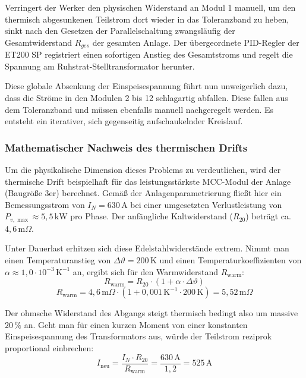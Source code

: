 Verringert der Werker den physischen Widerstand an Modul 1 manuell, um den thermisch abgesunkenen Teilstrom dort wieder in das Toleranzband zu heben, sinkt nach den Gesetzen der Parallelschaltung zwangsläufig der Gesamtwiderstand $R_{ges}$ der gesamten Anlage. Der übergeordnete PID-Regler der ET200 SP registriert einen sofortigen Anstieg des Gesamtstroms und regelt die Spannung am Ruhstrat-Stelltransformator herunter. 

Diese globale Absenkung der Einspeisespannung führt nun unweigerlich dazu, dass die Ströme in den Modulen 2 bis 12 schlagartig abfallen. Diese fallen aus dem Toleranzband und müssen ebenfalls manuell nachgeregelt werden. Es entsteht ein iterativer, sich gegenseitig aufschaukelnder Kreislauf.
\subsubsection{Mathematischer Nachweis des thermischen Drifts}
\label{sec:mathematischer_nachweis}
Um die physikalische Dimension dieses Problems zu verdeutlichen, wird der thermische Drift beispielhaft für das leistungsstärkste MCC-Modul der Anlage (Baugröße 3er) berechnet. Gemäß der Anlagenparametrierung fließt hier ein Bemessungsstrom von $I_N = 630\,\text{A}$ bei einer umgesetzten Verlustleistung von $P_{v,\max} \approx 5,5\,\text{kW}$ pro Phase. Der anfängliche Kaltwiderstand ($R_{20}$) beträgt ca. $4,6\,\text{m}\Omega$.

Unter Dauerlast erhitzen sich diese Edelstahlwiderstände extrem. Nimmt man einen Temperaturanstieg von $\Delta\vartheta = 200\,\text{K}$ und einen Temperaturkoeffizienten von $\alpha \approx 1,0 \cdot 10^{-3}\,\text{K}^{-1}$ an, ergibt sich für den Warmwiderstand $R_{\text{warm}}$:
\begin{equation}
    R_{\text{warm}} = R_{20} \cdot (1 + \alpha \cdot \Delta\vartheta)
\end{equation}
\begin{equation}
    R_{\text{warm}} = 4,6\,\text{m}\Omega \cdot (1 + 0,001\,\text{K}^{-1} \cdot 200\,\text{K}) = 5,52\,\text{m}\Omega
\end{equation}

Der ohmsche Widerstand des Abgangs steigt thermisch bedingt also um massive $20\,\%$ an. Geht man für einen kurzen Moment von einer konstanten Einspeisespannung des Transformators aus, würde der Teilstrom reziprok proportional einbrechen:
\begin{equation}
    I_{\text{neu}} = \frac{I_N \cdot R_{20}}{R_{\text{warm}}} = \frac{630\,\text{A}}{1,2} = 525\,\text{A}
\end{equation}

